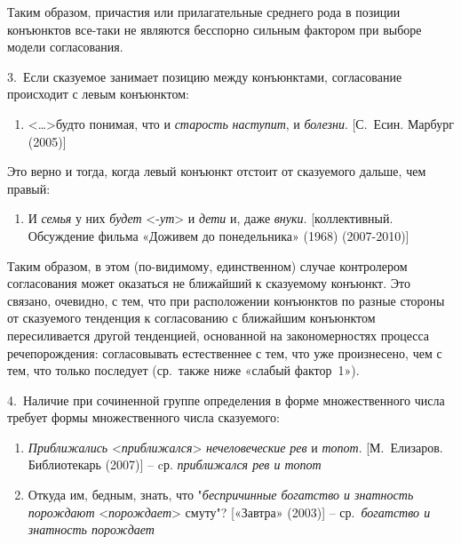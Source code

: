 Таким образом, причастия или прилагательные среднего рода в позиции
конъюнктов все-таки не являются бесспорно сильным фактором при выборе
модели согласования.

3.~Если сказуемое занимает позицию между конъюнктами, согласование
происходит с левым конъюнктом:

\begin{enumerate}
\def\labelenumi{(\arabic{enumi})}
\setcounter{enumi}{93}
\item
  \textless\ldots\textgreater будто понимая, что и \emph{старость}
  \emph{наступит}, и \emph{болезни}. {[}С.~Есин. Марбург (2005){]}
\end{enumerate}

Это верно и тогда, когда левый конъюнкт отстоит от сказуемого дальше,
чем правый:

\begin{enumerate}
\def\labelenumi{(\arabic{enumi})}
\setcounter{enumi}{94}
\item
  И \emph{семья} у них \emph{будет} \textless*-\emph{ут}\textgreater{} и
  \emph{дети} и, даже \emph{внуки}. {[}коллективный. Обсуждение фильма
  «Доживем до понедельника» (1968) (2007-2010){]}
\end{enumerate}

Таким образом, в этом (по-видимому, единственном) случае контролером
согласования может оказаться не ближайший к сказуемому конъюнкт. Это
связано, очевидно, с тем, что при расположении конъюнктов по разные
стороны от сказуемого тенденция к согласованию с ближайшим конъюнктом
пересиливается другой тенденцией, основанной на закономерностях процесса
речепорождения: согласовывать естественнее с тем, что уже произнесено,
чем с тем, что только последует (ср.~также ниже «слабый фактор~1»).

4.~Наличие при сочиненной группе определения в форме множественного
числа требует формы множественного числа сказуемого:

\begin{enumerate}
\def\labelenumi{(\arabic{enumi})}
\setcounter{enumi}{95}
\item
  \emph{Приближались} \textless*\emph{приближался}\textgreater{}
  \emph{нечеловеческие} \emph{рев} и \emph{топот}. {[}М.~Елизаров.
  Библиотекарь (2007){]} -- cр. \emph{приближался рев и топот}
\item
  Откуда им, бедным, знать, что "\emph{беспричинные богатство и
  знатность порождают} \textless*\emph{порождает}\textgreater{} смуту"?
  {[}«Завтра» (2003){]} -- ср.~\emph{богатство и знатность порождает}
\end{enumerate}

